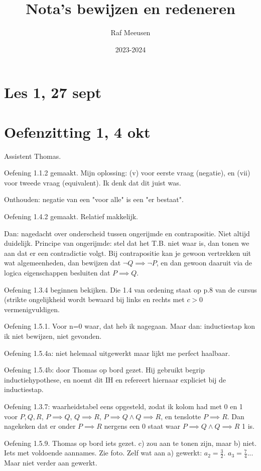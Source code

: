 \documentclass{article}
\title{Nota's bewijzen en redeneren}
\author{Raf Meeusen}
\date{2023-2024}
\begin{document}
\maketitle

\section{Les 1, 27 sept}

\section{Oefenzitting 1, 4 okt}

Assistent Thomas. 

Oefening 1.1.2 gemaakt. Mijn oplossing: (v) voor eerste vraag (negatie), en (vii) voor tweede vraag (equivalent). Ik denk dat dit juist was. 

Onthouden: negatie van een "voor alle" is een "er bestaat". 

Oefening 1.4.2 gemaakt. Relatief makkelijk. 

Dan: nagedacht over onderscheid tussen ongerijmde en contrapositie. Niet altijd duidelijk. Principe van ongerijmde: stel dat het T.B. niet waar is, dan tonen we aan dat er een contradictie volgt. Bij contrapositie kan je gewoon vertrekken uit wat algemeenheden, dan bewijzen dat $\neg Q \implies \neg P$, en dan gewoon daaruit via de logica eigenschappen besluiten dat $P \implies Q$. 

Oefening 1.3.4 beginnen bekijken. Die 1.4 van ordening staat op p.8 van de cursus (strikte ongelijkheid wordt bewaard bij links en rechts met $c>0$ vermenigvuldigen. 

Oefening 1.5.1. Voor n=0 waar, dat heb ik nagegaan. Maar dan: inductiestap kon ik niet bewijzen, niet gevonden. 

Oefening 1.5.4a: niet helemaal uitgewerkt maar lijkt me perfect haalbaar. 

Oefening 1.5.4b: door Thomas op bord gezet. Hij gebruikt begrip inductiehypothese, en noemt dit IH en refereert hiernaar expliciet bij de inductiestap. 

Oefening 1.3.7: waarheidstabel eens opgesteld, zodat ik kolom had met 0 en 1 voor $P, Q, R$, $P \implies Q$, $Q \implies R$, $P \implies Q \land Q \implies R$, en tenslotte $P \implies R$. Dan nagekeken dat er onder  $P \implies R$ nergens een 0 staat waar $P \implies Q \land Q \implies R$ 1 is. 

Oefening 1.5.9. Thomas op bord iets gezet. c) zou aan te tonen zijn, maar b) niet. Iets met voldoende aannames. Zie foto. 
Zelf wat aan a) gewerkt: $a_2 = \frac{3}{2}$. $a_3 = \frac{7}{4}$... Maar niet verder aan gewerkt. 
\end{document}
